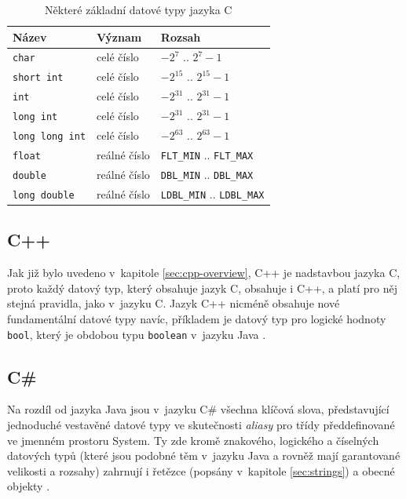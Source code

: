 \documentclass[czech,BP]{thesiskiv}
\begin{document}
\begin{table}\centering
\caption{Některé základní datové typy jazyka C}
\begin{tabular}{| l | l | l |}
\hline
\textbf{Název} & \textbf{Význam} & \textbf{Rozsah} \\ \hline
\texttt{char} & celé číslo & $-2^7$ .. $2^7-1$ \\ \hline
\texttt{short int} & celé číslo & $-2^{15}$ .. $2^{15}-1$ \\ \hline
\texttt{int} & celé číslo & $-2^{31}$ .. $2^{31}-1$ \\ \hline
\texttt{long int} & celé číslo & $-2^{31}$ .. $2^{31}-1$ \\ \hline
\texttt{long long int} & celé číslo & $-2^{63}$ .. $2^{63}-1$ \\ \hline
\texttt{float} & reálné číslo & \texttt{FLT\_MIN} .. \texttt{FLT\_MAX} \\ \hline
\texttt{double} & reálné číslo & \texttt{DBL\_MIN} .. \texttt{DBL\_MAX} \\ \hline
\texttt{long double} & reálné číslo & \texttt{LDBL\_MIN} .. \texttt{LDBL\_MAX} \\ \hline
\end{tabular}
\label{table:c-types}
\end{table}

\subsection{C++}
Jak již bylo uvedeno v~kapitole \ref{sec:cpp-overview}, C++ je nadstavbou jazyka C, proto každý datový typ, který obsahuje jazyk C, obsahuje i C++, a platí pro něj stejná pravidla, jako v~jazyku C. Jazyk C++ nicméně obsahuje nové fundamentální datové typy navíc, příkladem je datový typ pro logické hodnoty \texttt{bool}, který je obdobou typu \texttt{boolean} v~jazyku Java \cite{cpp-book, cpp-guide-types}.\par

\subsection{C\#}
Na rozdíl od jazyka Java jsou v~jazyku C\# všechna klíčová slova, představující jednoduché vestavěné datové typy ve skutečnosti \textit{aliasy} pro třídy předdefinované ve jmenném prostoru System. Ty zde kromě znakového, logického a číselných datových typů (které jsou podobné těm v~jazyku Java a rovněž mají garantované velikosti a rozsahy) zahrnují i řetězce (popsány v~kapitole \ref{sec:strings}) a obecné objekty \cite{cs-book, cs-guide-types, cs-guide-sbyte, cs-guide-short, cs-guide-int, cs-guide-long, cs-guide-float, cs-guide-double, cs-guide-bool, cs-guide-char}.
\end{document}

